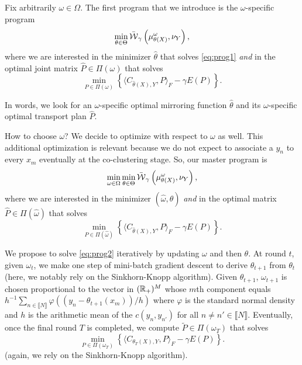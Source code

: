 Fix arbitrarily  $\omega \in \Omega$. The  first program that we  introduce is
the $\omega$-specific program
\begin{equation}
  \label{eq:prog1}
  \min_{\theta   \in  \Theta}   \bar{\operatorname{\mathcal{W}}}_{\gamma}\left(\mu_{\theta(X)}^{\omega},
    \nu_Y\right), 
\end{equation}
where  we  are   interested  in  the  minimizer   $\hat{\theta}$  that  solves
\eqref{eq:prog1}     \textit{and}    in     the    optimal     joint    matrix
$\hat{P} \in \Pi(\omega)$ that solves
\begin{equation*}
  \min_{P \in \Pi(\omega)}  \left\{\langle  C_{\hat{\theta}(X),  Y},  P \rangle_F  -
    \gamma E(P)\right\}.
\end{equation*}

In  words,  we  look  for  an  $\omega$-specific  optimal  mirroring  function
$\hat{\theta}$ and its $\omega$-specific optimal transport plan $\hat{P}$.

How to  choose $\omega$?  We  decide to optimize  with respect to  $\omega$ as
well. This  additional optimization is  relevant because  we do not  expect to
associate  a  $y_{n}$  to  every   $x_{m}$  eventually  at  the  co-clustering
stage. So, our master program is
\begin{equation}
  \label{eq:prog2}
  \min_{\omega      \in       \Omega}      \min_{\theta       \in      \Theta}
  \bar{\operatorname{\mathcal{W}}}_{\gamma}\left(\mu_{\theta(X)}^{\omega}, \nu_Y\right),
\end{equation}
where  we  are  interested   in  the  minimizer  $(\hat{\omega},\hat{\theta})$
\textit{and} in the optimal matrix $\hat{P} \in \Pi(\hat{\omega})$ that solves
\begin{equation}
  \label{eq:secondary}
  \min_{P  \in  \Pi(\hat{\omega})}  \left\{\langle C_{\hat{\theta}(X),  Y},  P
    \rangle_F -     \gamma E(P)\right\}.
\end{equation}


We propose to solve \eqref{eq:prog2} iteratively by updating $\omega$ and then
$\theta$.  At  round $t$, given $\omega_{t}$,  we make one step  of mini-batch
gradient descent to derive $\theta_{t+1}$  from $\theta_{t}$ (here, we notably
rely on  the Sinkhorn-Knopp algorithm).  Given  $\theta_{t+1}$, $\omega_{t+1}$
is chosen proportional to the vector in $(\mathbb{R}_{+})^{M}$ whose $m$th component
equals
$h^{-1}\sum_{n     \in     \llbracket      N\rrbracket}     \varphi((y_n     -
\theta_{t+1}(x_m))/h)$ where $\varphi$ is the  standard normal density and $h$
is   the    arithmetic   mean    of   the    $c(y_{n},   y_{n'})$    for   all
$n \neq n'  \in \llbracket N\rrbracket$. Eventually, once the  final round $T$
is completed, we compute $\tilde{P} \in \Pi(\omega_{T})$ that solves
\begin{equation*}
  \min_{P \in \Pi(\omega_{T})} \left\{\langle  C_{\theta_T(X), Y}, P \rangle_F
    -     \gamma E(P)\right\}.
\end{equation*}
(again, we rely on the Sinkhorn-Knopp algorithm).


